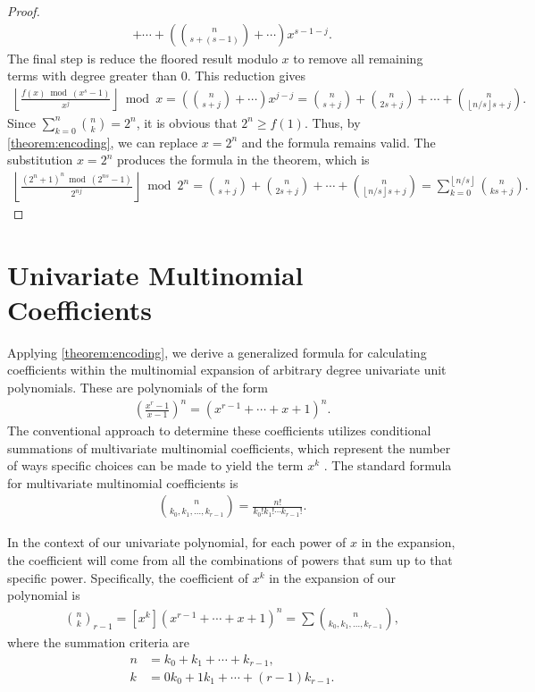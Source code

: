 \documentclass[10pt]{article}
\theoremstyle{plain}
\newcommand{\floor}[1]{\left\lfloor #1 \right\rfloor}
\begin{document}
\begin{proof}
\begin{align*}
+ \cdots
+ \left(\binom{n}{s+(s-1)} + \cdots \right) x^{s-1-j} .
\end{align*}
The final step is reduce the floored result modulo $x$ to remove all remaining terms with degree greater than $0$. This reduction gives
\begin{align*}
\floor{\frac{f(x) \bmod(x^s-1)}{x^j}} \bmod x
= \left(\binom{n}{s+j} + \cdots \right) x^{j-j}
= \binom{n}{s+j} + \binom{n}{2s+j} + \cdots + \binom{n}{\floor{n/s}s+j}
.
\end{align*}
Since $\sum_{k=0}^{n} \binom{n}{k} = 2^n$, it is obvious that $2^n \geq f(1)$. Thus, by \cref{theorem:encoding}, we can replace $x=2^n$ and the formula remains valid. The substitution $x=2^n$ produces the formula in the theorem, which is
\begin{align*}
\floor{\frac{(2^n+1)^n \bmod(2^{ns}-1)}{2^{nj}}} \bmod 2^n
= \binom{n}{s+j} + \binom{n}{2s+j} + \cdots + \binom{n}{\floor{n/s}s+j}
= \sum_{k=0}^{\floor{n/s}} \binom{n}{ks+j} .
\end{align*}
\end{proof}

\section{Univariate Multinomial Coefficients} \label{section:multinomialformula}
Applying \cref{theorem:encoding}, we derive a generalized formula for calculating coefficients within the multinomial expansion of arbitrary degree univariate unit polynomials. These are polynomials of the form
\begin{align*}
    \left(\frac{x^{r}-1}{x-1}\right)^n = (x^{r-1} + \cdots + x + 1)^n  .
\end{align*}
The conventional approach to determine these coefficients utilizes conditional summations of multivariate multinomial coefficients, which represent the number of ways specific choices can be made to yield the term \(x^k\) \cite{graham1994concrete}. The standard formula for multivariate multinomial coefficients is
\begin{align*}
    \binom{n}{k_0, k_1, \ldots, k_{r-1}} = \frac{n!}{k_0! k_1! \cdots k_{r-1}!} .
\end{align*}

In the context of our univariate polynomial, for each power of \(x\) in the expansion, the coefficient will come from all the combinations of powers that sum up to that specific power. Specifically, the coefficient of \(x^k\) in the expansion of our polynomial is \cite{brualdi2010intro}
\begin{align*}
    \binom{n}{k}_{r-1} = [x^k](x^{r-1} + \cdots + x + 1)^n = \sum \binom{n}{k_0, k_1, \ldots, k_{r-1}} ,
\end{align*}
where the summation criteria are
\begin{align*}
    n &= k_0 + k_1 + \cdots + k_{r-1},
    \\
    k &= 0 k_0 + 1 k_1 + \cdots + (r-1) k_{r-1}.
\end{align*}
\end{document}
